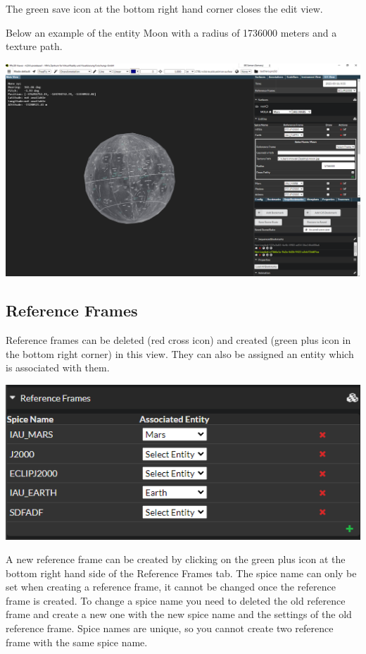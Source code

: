 The green save icon at the bottom right hand corner closes the edit
view.

Below an example of the entity Moon with a radius of 1736000 meters and
a texture path.

\includegraphics{images/exampleMoonTexture.png}

\hypertarget{reference-frames}{%
\subsection{Reference Frames}\label{reference-frames}}

Reference frames can be deleted (red cross icon) and created (green plus
icon in the bottom right corner) in this view. They can also be assigned
an entity which is associated with them.

\includegraphics{images/referenceFrames.png}

A new reference frame can be created by clicking on the green plus icon
at the bottom right hand side of the Reference Frames tab. The spice
name can only be set when creating a reference frame, it cannot be
changed once the reference frame is created. To change a spice name you
need to deleted the old reference frame and create a new one with the
new spice name and the settings of the old reference frame. Spice names
are unique, so you cannot create two reference frame with the same spice
name.

